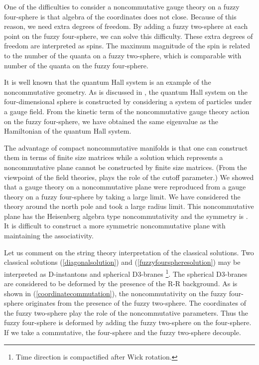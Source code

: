 \documentclass[a4paper,11pt]{article}
\begin{document}
One of the difficulties to consider a noncommutative 
gauge theory on a fuzzy four-sphere is that 
algebra of the coordinates does not close. 
Because of this reason, we need extra degrees of freedom. 
By adding a fuzzy two-sphere at each point on the fuzzy four-sphere, 
we can solve this difficulty. 
These extra degrees of freedom are interpreted as spins. 
The maximum magnitude of the spin is related to the 
number of the quanta on a fuzzy two-sphere, 
which is comparable with number of the quanta on the fuzzy four-sphere. 

It is well known that 
the quantum Hall system is an example of the noncommutative 
geometry. 
As is discussed in \cite{zhanghu}, 
the quantum Hall system on the four-dimensional sphere 
is constructed by considering 
a system of particles under a \coordHE{} gauge field. 
From the kinetic term of the noncommutative gauge 
theory action on the fuzzy four-sphere, we have 
obtained the same eigenvalue as the 
Hamiltonian of the quantum Hall system. 

The advantage of compact noncommutative manifolds is that 
one can construct them in terms of finite size 
matrices 
while a solution which represents a noncommutative plane 
cannot be constructed by finite size matrices. 
(From the viewpoint of the field theories, 
\coordHE{} plays the role of the cutoff parameter.) 
We showed that 
a gauge theory on a noncommutative plane 
were reproduced from 
a gauge theory on 
a fuzzy four-sphere by taking a large \coordHE{} limit.  
We have considered the theory around the north pole and 
took a large radius limit.
This noncommutative plane has the Heisenberg algebra type 
noncommutativity and the symmetry is \coordHE{}. 
It is difficult to construct a more symmetric 
noncommutative plane with maintaining the associativity. 

Let us comment on the string theory interpretation 
of the classical solutions. 
Two classical solutions (\ref{diagonalsolution}) and 
(\ref{fuzzyfourspheresolution}) 
may be interpreted as 
D-instantons and spherical D3-branes
\footnote{Time direction is compactified after 
Wick rotation.
}. 
The spherical D3-branes are considered 
to be deformed by the presence of 
the R-R background. 
As is shown in (\ref{coordinatecommutation}), 
the noncommutativity on the fuzzy four-sphere 
originates from the presence of the fuzzy two-sphere. 
The coordinates of the fuzzy two-sphere play the role 
of the noncommutative parameters. 
Thus the fuzzy four-sphere is deformed 
by adding the fuzzy two-sphere on the 
four-sphere. 
If we take a commutative, the four-sphere and 
the fuzzy two-sphere decouple. 
\end{document}

